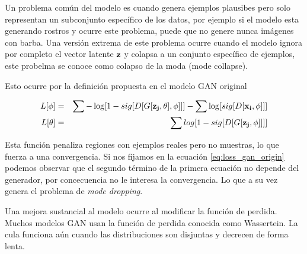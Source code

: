 \documentclass[letterpaper,12pt,oneside]{book}
\begin{document}
                    Un problema común del modelo es cuando genera ejemplos plausibes pero solo representan un subconjunto específico de los datos, por ejemplo si el modelo esta generando rostros y ocurre este problema, puede que no genere nunca imágenes con barba. Una versión extrema de este problema ocurre cuando el modelo ignora por completo el vector latente ${\bf z}$ y colapsa a un conjunto específico de ejemplos, este probelma se conoce como colapso de la moda (mode collapse).

                    Esto ocurre por la definición propuesta en el modelo GAN original 
                    
                    \begin{eqnarray}
                        \label{eq:loss_gan_origin}
                        L[\phi] &=& \sum -\log[1 - sig[D[G[{\bf z_j, \theta}],\phi]]] - \sum \log[sig[D[{\bf x_i}, \phi]]]\\
                        L[\theta] &=& \sum log[1 - sig[D[G[{\bf z_j}, \phi]]]]
                    \end{eqnarray}

                    Esta función penaliza regiones con ejemplos reales pero no muestras, lo que fuerza a una convergencia. Si nos fijamos en la ecuación \ref{eq:loss_gan_origin} podemos observar que el segundo término de la primera ecuación no depende del generador, por concecuencia no le interesa la convergencia. Lo que a su vez genera el problema de {\it mode dropping}.

                    Una mejora sustancial al modelo ocurre al modificar la función de perdida. Muchos modelos GAN usan la función de perdida conocida como Wassertein. La cula funciona aún cuando las distribuciones son disjuntas y decrecen de forma lenta. 


        \printbibliography
        \nocite{*}
        \backmatter%

    
\end{document}
